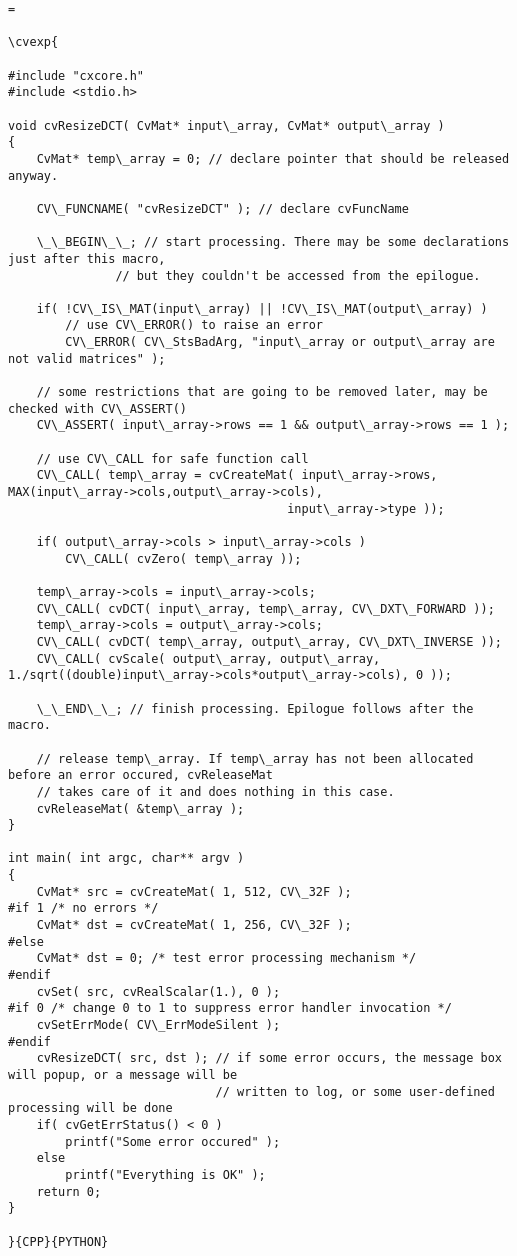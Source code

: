 \begin{verbatim}=

\cvexp{

#include "cxcore.h"
#include <stdio.h>

void cvResizeDCT( CvMat* input\_array, CvMat* output\_array )
{
    CvMat* temp\_array = 0; // declare pointer that should be released anyway.

    CV\_FUNCNAME( "cvResizeDCT" ); // declare cvFuncName

    \_\_BEGIN\_\_; // start processing. There may be some declarations just after this macro,
               // but they couldn't be accessed from the epilogue.

    if( !CV\_IS\_MAT(input\_array) || !CV\_IS\_MAT(output\_array) )
        // use CV\_ERROR() to raise an error
        CV\_ERROR( CV\_StsBadArg, "input\_array or output\_array are not valid matrices" );

    // some restrictions that are going to be removed later, may be checked with CV\_ASSERT()
    CV\_ASSERT( input\_array->rows == 1 && output\_array->rows == 1 );

    // use CV\_CALL for safe function call
    CV\_CALL( temp\_array = cvCreateMat( input\_array->rows, MAX(input\_array->cols,output\_array->cols),
                                       input\_array->type ));

    if( output\_array->cols > input\_array->cols )
        CV\_CALL( cvZero( temp\_array ));

    temp\_array->cols = input\_array->cols;
    CV\_CALL( cvDCT( input\_array, temp\_array, CV\_DXT\_FORWARD ));
    temp\_array->cols = output\_array->cols;
    CV\_CALL( cvDCT( temp\_array, output\_array, CV\_DXT\_INVERSE ));
    CV\_CALL( cvScale( output\_array, output\_array, 1./sqrt((double)input\_array->cols*output\_array->cols), 0 ));

    \_\_END\_\_; // finish processing. Epilogue follows after the macro.

    // release temp\_array. If temp\_array has not been allocated before an error occured, cvReleaseMat
    // takes care of it and does nothing in this case.
    cvReleaseMat( &temp\_array );
}

int main( int argc, char** argv )
{
    CvMat* src = cvCreateMat( 1, 512, CV\_32F );
#if 1 /* no errors */
    CvMat* dst = cvCreateMat( 1, 256, CV\_32F );
#else
    CvMat* dst = 0; /* test error processing mechanism */
#endif
    cvSet( src, cvRealScalar(1.), 0 );
#if 0 /* change 0 to 1 to suppress error handler invocation */
    cvSetErrMode( CV\_ErrModeSilent );
#endif
    cvResizeDCT( src, dst ); // if some error occurs, the message box will popup, or a message will be
                             // written to log, or some user-defined processing will be done
    if( cvGetErrStatus() < 0 )
        printf("Some error occured" );
    else
        printf("Everything is OK" );
    return 0;
}

}{CPP}{PYTHON}


\end{verbatim}
